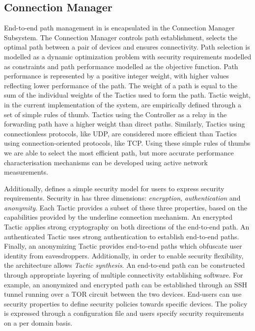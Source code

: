 \subsection{Connection Manager} \label{signpost-engine}

End-to-end path management in \signpost is encapsulated in the Connection
Manager Subsystem.  The Connection Manager controls path establishment, selects
the optimal path between a pair of devices and ensures connectivity.  Path
selection is modelled as a dynamic optimization problem with security
requirements modelled as constraints and path performance modelled as the
objective function.  Path performance is represented by a positive integer
weight, with higher values reflecting lower performance of the path. The weight
of a path is equal to the sum of the individual weights of the Tactics used to
form the path. Tactic weight, in the current implementation of the system, are
empirically defined through a set of simple rules of thumb. Tactics using 
the Controller as a relay in the forwarding path have a higher weight than direct paths.
Similarly, Tactics using connectionless protocols, like UDP, are considered more
efficient than Tactics using connection-oriented protocols, like TCP\@.  Using
these simple rules of thumbs we are able to select the most efficient path, but
more accurate performance characterisation mechanisms can be developed using
active network measurements. 

Additionally, \signpost defines a simple security model for users to express
security requirements. Security in \signpost has three dimensions:
\textit{encryption}, \textit{authentication} and \textit{anonymity}.  Each
Tactic provides a subset of these three properties, based on the capabilities
provided by the underline connection mechanism. An encrypted Tactic applies
strong cryptography on both directions of the end-to-end path. An authenticated
Tactic uses strong authentication to establish end-to-end paths.  Finally, an
anonymizing Tactic provides end-to-end paths which obfuscate user identity from
eavesdroppers.  Additionally, in order to enable security flexibility, the
\signpost architecture allows {\it Tactic synthesis}. An end-to-end path can be constructed 
through appropriate layering of multiple connectivity establishing software. 
For example, an anonymized and encrypted path can be established
through an SSH tunnel running over a TOR circuit between the two devices.
End-users can use security properties to define security policies towards
specific devices. The policy is expressed through a configuration file and users
specify security requirements on a per domain basis. 

